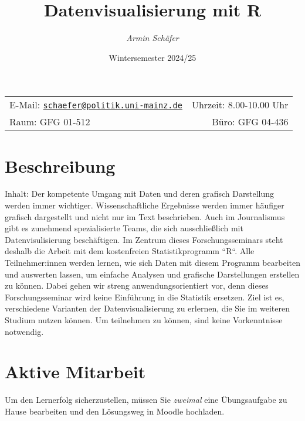 \documentclass[11pt,]{scrartcl}
\title{\textbf{Datenvisualisierung mit R}}
\author{\emph{Armin Schäfer}}
\date{Wintersemester 2024/25}
\begin{document}
  
	
		\maketitle
		
	
	\thispagestyle{firststyle}
	
	
	\noindent \begin{tabular*}{\textwidth}{ @{\extracolsep{\fill}} lr @{\extracolsep{\fill}}}
		
		
	E-Mail: \texttt{\href{mailto:schaefer@politik.uni-mainz.de}{\nolinkurl{schaefer@politik.uni-mainz.de}}} & Uhrzeit: 8.00-10.00
Uhr\\
	Raum: GFG 01-512 & Büro: GFG 04-436\\
		\hline
	\end{tabular*}
	
	\vspace{2mm}
	
	
	
	\section{Beschreibung}\label{beschreibung}

Inhalt: Der kompetente Umgang mit Daten und deren grafisch Darstellung
werden immer wichtiger. Wissenschaftliche Ergebnisse werden immer
häufiger grafisch dargestellt und nicht nur im Text beschrieben. Auch im
Journalismus gibt es zunehmend spezialisierte Teams, die sich
ausschließlich mit Datenvisulisierung beschäftigen. Im Zentrum dieses
Forschungsseminars steht deshalb die Arbeit mit dem kostenfreien
Statistikprogramm ``R``. Alle Teilnehmer:innen werden lernen, wie sich
Daten mit diesem Programm bearbeiten und auswerten lassen, um einfache
Analysen und grafische Darstellungen erstellen zu können. Dabei gehen
wir streng anwendungsorientiert vor, denn dieses Forschungsseminar wird
keine Einführung in die Statistik ersetzen. Ziel ist es, verschiedene
Varianten der Datenvisualisierung zu erlernen, die Sie im weiteren
Studium nutzen können. Um teilnehmen zu können, sind keine Vorkenntnisse
notwendig.

\section{Aktive Mitarbeit}\label{aktive-mitarbeit}

Um den Lernerfolg sicherzustellen, müssen Sie \emph{zweimal} eine
Übungsaufgabe zu Hause bearbeiten und den Lösungsweg in Moodle
hochladen.
\end{document}
